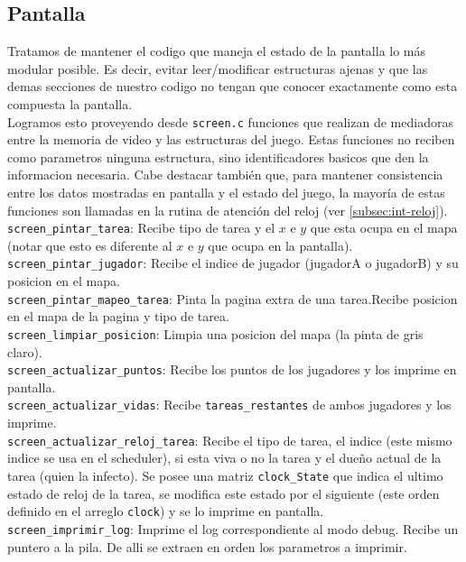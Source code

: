 \subsection{Pantalla}

Tratamos de mantener el codigo que maneja el estado de la pantalla lo más modular posible. Es decir, evitar leer/modificar estructuras ajenas  y que las demas secciones de nuestro codigo no tengan que conocer exactamente como esta compuesta la pantalla.\\

Logramos esto proveyendo desde  \verb|screen.c| funciones que realizan de mediadoras entre la memoria de video y las estructuras del juego. Estas funciones no reciben como parametros ninguna estructura, sino identificadores basicos que den la informacion necesaria. Cabe destacar también que, para mantener consistencia entre los datos mostradas en pantalla y el estado del juego, la mayoría de estas funciones son llamadas en la rutina de atención del reloj (ver \ref{subsec:int-reloj}).\\


\verb|screen_pintar_tarea|: Recibe tipo de tarea y el $x$ e $y$ que esta ocupa en el mapa (notar que esto es diferente al $x$ e $y$ que ocupa en la pantalla).\\

\verb|screen_pintar_jugador|: Recibe el indice de jugador (jugadorA o jugadorB) y su posicion en el mapa.\\

\verb|screen_pintar_mapeo_tarea|: Pinta la pagina extra de una tarea.Recibe posicion en el mapa de la pagina y tipo de tarea.\\

\verb|screen_limpiar_posicion|: Limpia una posicion del mapa (la pinta de gris claro).\\

\verb|screen_actualizar_puntos|: Recibe los puntos de los jugadores y los imprime en pantalla.\\

\verb|screen_actualizar_vidas|: Recibe \verb|tareas_restantes| de ambos jugadores y los imprime.\\

\verb|screen_actualizar_reloj_tarea|: Recibe el tipo de tarea, el indice (este mismo indice se usa en el scheduler), si esta viva o no la tarea y el dueño actual de la tarea (quien la infecto). Se posee una matriz \verb|clock_State| que indica el ultimo estado de reloj de la tarea, se modifica este estado por el siguiente (este orden definido en el arreglo \verb|clock|) y se lo imprime en pantalla.\\

\verb|screen_imprimir_log|: Imprime el log correspondiente al modo debug. Recibe un puntero a la pila. De alli se extraen en orden los parametros a imprimir.\\

